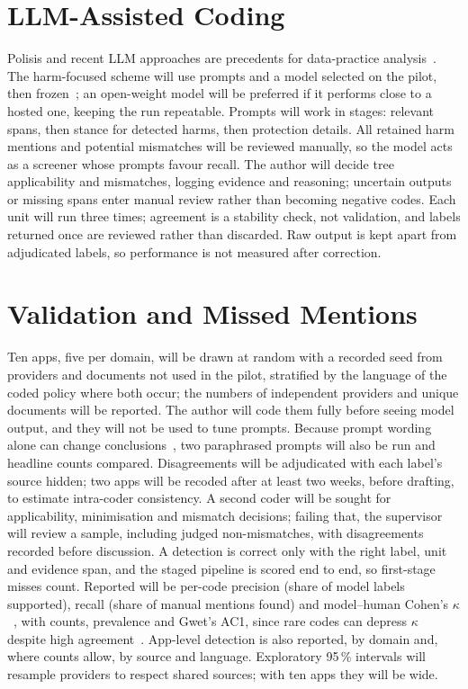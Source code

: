 \section{LLM-Assisted Coding} Polisis and recent LLM approaches are precedents for
data-practice analysis~\parencite{harkous2018polisis,rodriguez2024llm}. The
harm-focused scheme will use prompts and a model selected on the pilot, then
frozen~\parencite{tornberg2024best}; an open-weight model will be preferred if
it performs close to a hosted one, keeping the run repeatable. Prompts will
work in stages: relevant spans, then stance for detected harms, then
protection details. All retained harm mentions and potential mismatches will
be reviewed manually, so the model acts as a screener whose prompts favour
recall. The author will decide tree applicability and mismatches, logging
evidence and reasoning; uncertain outputs or missing spans enter manual
review rather than becoming negative codes. Each unit will run three times;
agreement is a stability check, not validation, and labels returned once are
reviewed rather than discarded. Raw output is kept apart from adjudicated
labels, so performance is not measured after correction.

\section{Validation and Missed Mentions} Ten apps, five per domain, will be
drawn at random with a recorded seed from providers and documents not used in
the pilot, stratified by the language of the coded policy where both occur;
the numbers of independent providers and unique documents will be reported.
The author will code them fully before seeing model output, and they will not
be used to tune prompts. Because prompt wording alone can change
conclusions~\parencite{baumann2025llm}, two paraphrased prompts will also be
run and headline counts compared. Disagreements will be adjudicated with each
label's source hidden; two apps will be recoded after at least two weeks,
before drafting, to estimate intra-coder consistency. A second coder will be
sought for applicability, minimisation and mismatch decisions; failing that,
the supervisor will review a sample, including judged non-mismatches, with
disagreements recorded before discussion. A detection is correct only with
the right label, unit and evidence span, and the staged pipeline is scored end
to end, so first-stage misses count. Reported will be per-code precision
(share of model labels supported), recall (share of manual mentions found)
and model--human Cohen's $\kappa$~\parencite{cohen1960coefficient}, with
counts, prevalence and Gwet's AC1, since rare codes can depress $\kappa$
despite high agreement~\parencite{feinstein1990high,gwet2008computing}.
App-level detection is also reported, by domain and, where counts allow, by
source and language. Exploratory 95\,\% intervals will resample providers to
respect shared sources; with ten apps they will be wide.

